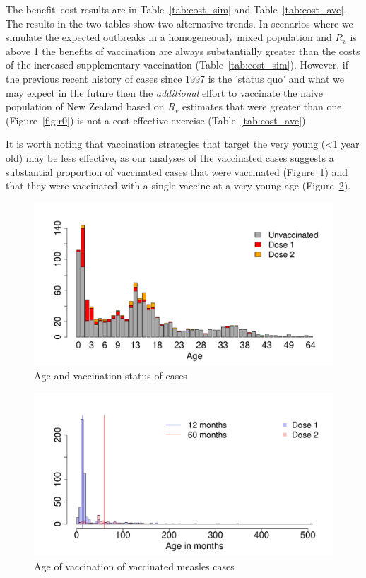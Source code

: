 \documentclass{article}
\begin{document}
\normalsize

The benefit--cost results are in Table~\ref{tab:cost_sim} and Table~\ref{tab:cost_ave}. The results in the two tables show two alternative trends. In scenarios where we simulate the expected outbreaks in a homogeneously mixed population and $R_v$ is above 1 the benefits of vaccination are always substantially greater than the costs of the increased supplementary vaccination (Table~\ref{tab:cost_sim}). However, if the previous recent history of cases since 1997 is the 'status quo' and what we may expect in the future then the \emph{additional} effort to vaccinate the naive population of New Zealand based on $R_v$ estimates that were greater than one (Figure~\ref{fig:r0}) is not a cost effective exercise (Table~\ref{tab:cost_ave}).

It is worth noting that vaccination strategies that target the very young (<1 year old) may be less effective, as our analyses of the vaccinated cases suggests a substantial proportion of vaccinated cases that were vaccinated (Figure~\ref{fig:ageandvac}) and that they were vaccinated with a single vaccine at a very young age (Figure~\ref{fig:vaccstat}).

\begin{figure}[h!]
\begin{center}
\includegraphics{interimreport2-038}
\end{center}
\caption{Age and vaccination status of cases}
\label{fig:ageandvac}
\end{figure}

\begin{figure}[h!]
\begin{center}
\includegraphics{interimreport2-039}
\end{center}
\caption{Age of vaccination of vaccinated measles cases}
\label{fig:vaccstat}
\end{figure}
\end{document}
